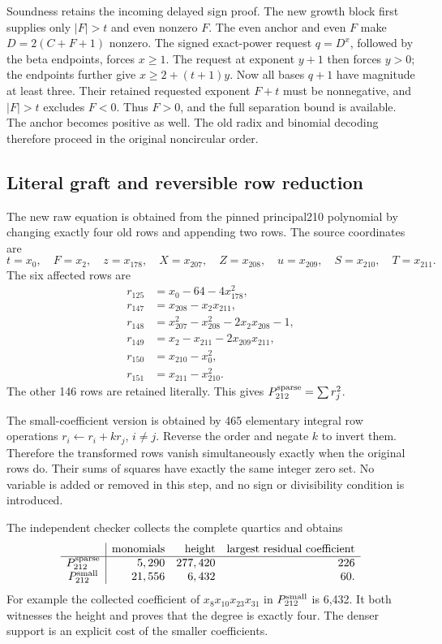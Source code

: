 \documentclass[10pt,letterpaper]{article}
\theoremstyle{remark}\newtheorem{remark}[theorem]{Remark}
\begin{document}
Soundness retains the incoming delayed sign proof. The new growth block
first supplies only $|F|>t$ and even nonzero $F$. The even anchor and
even $F$ make $D=2(C+F+1)$ nonzero. The signed exact-power request
$q=D^x$, followed by the beta endpoints, forces $x\ge1$.
The request at exponent $y+1$ then forces $y>0$; the endpoints further
give $x\ge2+(t+1)y$. Now all bases $q+1$ have magnitude at least three.
Their retained requested exponent $F+t$ must be nonnegative, and
$|F|>t$ excludes $F<0$. Thus $F>0$, and the full separation bound is
available. The anchor becomes positive as well. The old radix and binomial
decoding therefore proceed in the original noncircular order.

\subsection{Literal graft and reversible row reduction}

The new raw equation is obtained from the pinned principal210 polynomial
by changing exactly four old rows and appending two rows. The source
coordinates are
\[
 t=x_0,\quad F=x_2,\quad z=x_{178},\quad X=x_{207},
 \quad Z=x_{208},\quad u=x_{209},\quad S=x_{210},\quad T=x_{211}.
\]
The six affected rows are
\begin{align*}
 r_{125}&=x_0-64-4x_{178}^2,\\
 r_{147}&=x_{208}-x_2x_{211},\\
 r_{148}&=x_{207}^2-x_{208}^2-2x_2x_{208}-1,\\
 r_{149}&=x_2-x_{211}-2x_{209}x_{211},\\
 r_{150}&=x_{210}-x_0^2,\\
 r_{151}&=x_{211}-x_{210}^2.
\end{align*}
The other 146 rows are retained literally. This gives
$P_{212}^{\rm sparse}=\sum r_j^2$.

The small-coefficient version is obtained by 465 elementary integral row
operations $r_i\leftarrow r_i+kr_j$, $i\ne j$. Reverse the order and
negate $k$ to invert them. Therefore the transformed rows vanish
simultaneously exactly when the original rows do. Their sums of squares
have exactly the same integer zero set. No variable is added or removed
in this step, and no sign or divisibility condition is introduced.

The independent checker collects the complete quartics and obtains
\[
\begin{array}{c|rrr}
&\text{monomials}&\text{height}&\text{largest residual coefficient}\\\hline
P_{212}^{\rm sparse}&5,290&277,420&226\\
P_{212}^{\rm small}&21,556&6,432&60.
\end{array}
\]
For example the collected coefficient of $x_8x_{10}x_{23}x_{31}$ in
$P_{212}^{\rm small}$ is 6,432. It both witnesses the height and proves
that the degree is exactly four. The denser support is an explicit cost
of the smaller coefficients.
\end{document}
